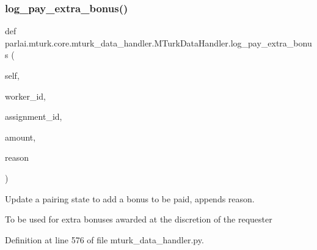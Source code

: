 \subsubsection{\texorpdfstring{log\+\_\+pay\+\_\+extra\+\_\+bonus()}{log\_pay\_extra\_bonus()}}
{\footnotesize\ttfamily def parlai.\+mturk.\+core.\+mturk\+\_\+data\+\_\+handler.\+M\+Turk\+Data\+Handler.\+log\+\_\+pay\+\_\+extra\+\_\+bonus (\begin{DoxyParamCaption}\item[{}]{self,  }\item[{}]{worker\+\_\+id,  }\item[{}]{assignment\+\_\+id,  }\item[{}]{amount,  }\item[{}]{reason }\end{DoxyParamCaption})}

\begin{DoxyVerb}Update a pairing state to add a bonus to be paid, appends reason.

To be used for extra bonuses awarded at the discretion of the requester
\end{DoxyVerb}
 

Definition at line 576 of file mturk\+\_\+data\+\_\+handler.\+py.


